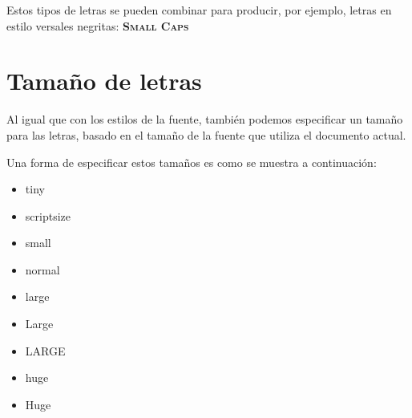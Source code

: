 \documentclass[letterpaper,12pt]{article}
\begin{document}
Estos tipos de letras se pueden combinar para producir, por ejemplo, letras en estilo versales negritas: \textbf{\textsc{Small Caps}}

\section{Tamaño de letras}

Al igual que con los estilos de la fuente, también podemos especificar un tamaño para las letras, basado en el tamaño de la fuente que utiliza el documento actual.

Una forma de especificar estos tamaños es como se muestra a continuación:

\begin{itemize}

\item {\tiny tiny}

\item {\scriptsize scriptsize}%

\item {\small small}

\item {\normalsize normal}

\item {\large large}

\item {\Large Large}

\item {\LARGE LARGE}

\item {\huge huge}

\item {\Huge Huge}

\end{itemize}
\end{document}
